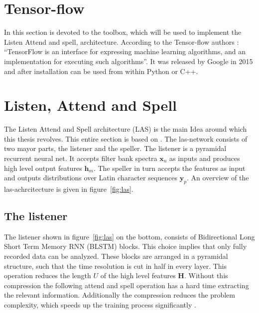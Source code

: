 \section{Tensor-flow}
In this section is devoted to the toolbox, which will be used to implement the Listen Attend and spell, architecture. According to the Tensor-flow authors \cite{Agarwal2015}: 
\textquotedblleft TensorFlow is an interface for expressing machine learning algorithms, and an implementation for executing such algorithms\textquotedblright . It was released by Google in 2015 and after installation can be used from within Python or C++. 



\section{Listen, Attend and Spell}
The Listen Attend and Spell architecture (LAS) is the main Idea around which this thesis revolves. This entire section is based on \cite{Chan2015}. The las-network consists of two mayor parts, the listener and the speller. The listener is a pyramidal recurrent neural net. It accepts filter bank spectra $\mathbf{x}_n$ as inputs and produces high level output features $\mathbf{h}_m$. The speller in turn accepts the features as input and outputs distributions over Latin character sequences $\mathbf{y}_p$. An overview of the las-achrcitecture is given in figure~\ref*{fig:las}.

\subsection{The listener}
The listener shown in figure~\ref*{fig:las} on the bottom, consists of Bidirectional Long Short Term Memory RNN (BLSTM) blocks. This choice implies that only fully recorded data can be analyzed.  These blocks are arranged in a pyramidal structure, such that the time resolution is cut in half in every layer. This operation reduces the length $U$ of the high level features $\mathbf{H}$. Without this compression the following attend and spell operation has a hard time extracting the relevant information. Additionally the compression reduces the problem complexity, which speeds up the training process significantly \cite[page 4]{Chan2015}.

